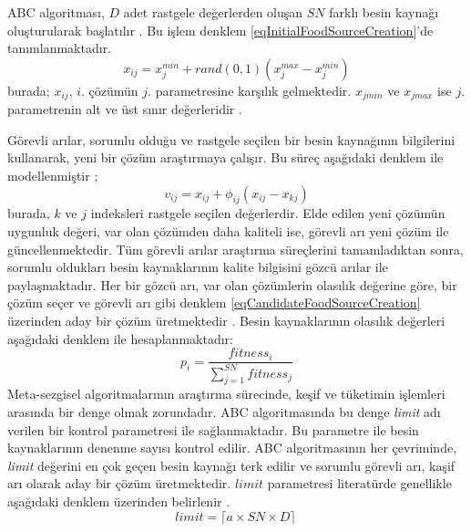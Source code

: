 \documentclass[conference]{IEEEtran}
\begin{document}
ABC algoritması, $D$ adet rastgele değerlerden oluşan $SN$ farklı besin kaynağı oluşturularak başlatılır \cite{karaboga2007powerful,karaboga2009comparative}. Bu işlem denklem \ref{eqInitialFoodSourceCreation}'de tanımlanmaktadır.
%
\begin{equation}
\label{eqInitialFoodSourceCreation}
x_{ij}=x_j^{min}+rand(0,1)(x_j^{max}-x_j^{min})
\end{equation}
%
burada; $x_{ij}$, $i$. çözümün $j$. parametresine karşılık gelmektedir. $x_{jmin}$ ve $x_{jmax}$ ise $j$. parametrenin alt ve üst sınır değerleridir \cite{karaboga2007powerful,karaboga2009comparative}.

Görevli arılar, sorumlu olduğu ve rastgele seçilen bir besin kaynağının bilgilerini kullanarak, yeni bir çözüm araştırmaya çalışır. Bu süreç aşağıdaki denklem ile modellenmiştir \cite{karaboga2007powerful,karaboga2009comparative};
%
\begin{equation}
\label{eqCandidateFoodSourceCreation}
v_{ij}=x_{ij}+\phi_{ij}(x_{ij}-x_{kj})
\end{equation}
%
burada, $k$ ve $j$ indeksleri rastgele seçilen değerlerdir. Elde edilen yeni çözümün uygunluk değeri, var olan çözümden daha kaliteli ise, görevli arı yeni çözüm ile güncellenmektedir. Tüm görevli arılar araştırma süreçlerini tamamladıktan sonra, sorumlu oldukları besin kaynaklarının kalite bilgisini gözcü arılar ile paylaşmaktadır. Her bir gözcü arı, var olan çözümlerin olasılık değerine göre, bir çözüm seçer ve görevli arı gibi denklem \ref{eqCandidateFoodSourceCreation} üzerinden aday bir çözüm üretmektedir \cite{karaboga2007powerful,karaboga2009comparative}. Besin kaynaklarının olasılık değerleri aşağıdaki denklem ile hesaplanmaktadır:
%
\begin{equation}
\label{eqProbabilityCalculation}
p_i=\frac{{fitness}_i}{\sum_{j=1}^{SN}{fitness}_j}
\end{equation}
%
Meta-sezgisel algoritmalarının araştırma sürecinde, keşif ve tüketimin işlemleri arasında bir denge olmak zorundadır. ABC algoritmasında bu denge \textit{limit} adı verilen bir kontrol parametresi ile sağlanmaktadır. Bu parametre ile besin kaynaklarının denenme sayısı kontrol edilir. ABC algoritmasının her çevriminde, \textit{limit} değerini en çok geçen besin kaynağı terk edilir ve sorumlu görevli arı, kaşif arı olarak aday bir çözüm üretmektedir. $limit$ parametresi literatürde genellikle aşağıdaki denklem üzerinden belirlenir \cite{karaboga2007powerful,karaboga2009comparative}.
%
\begin{equation}
\label{equation:LimitCalculation}
limit=\lceil a \times SN \times D \rceil \:
\end{equation}
\end{document}
